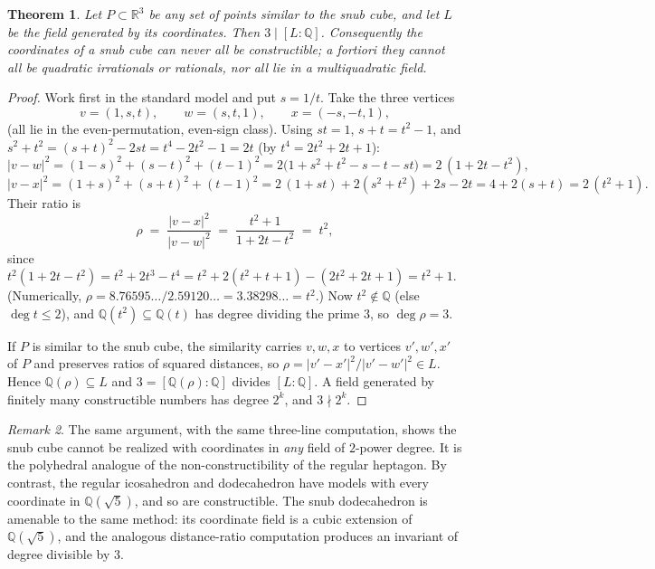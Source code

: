 \documentclass[11pt]{article}
\newtheorem{theorem}{Theorem}
\theoremstyle{definition}
\theoremstyle{remark}
\newtheorem{remark}[theorem]{Remark}
\newcommand{\Q}{\mathbb{Q}}
\newcommand{\R}{\mathbb{R}}
\begin{document}
\begin{theorem}\label{thm:snub}
Let $P \subset \R^3$ be any set of points similar to the snub cube, and let $L$ be the field
generated by its coordinates. Then $3 \mid [L : \Q]$. Consequently the coordinates of a snub
cube can never all be constructible; a fortiori they cannot all be quadratic irrationals or
rationals, nor all lie in a multiquadratic field.
\end{theorem}

\begin{proof}
Work first in the standard model and put $s = 1/t$. Take the three vertices
\[
v = (1, s, t), \qquad w = (s, t, 1), \qquad x = (-s, -t, 1),
\]
(all lie in the even-permutation, even-sign class). Using $st = 1$, $s + t = t^2 - 1$, and
$s^2 + t^2 = (s+t)^2 - 2st = t^4 - 2t^2 - 1 = 2t$ (by $t^4 = 2t^2 + 2t + 1$):
\[
|v - w|^2 = (1-s)^2 + (s-t)^2 + (t-1)^2
= 2\bigl(1 + s^2 + t^2 - s - t - st\bigr)
= 2\,(1 + 2t - t^2),
\]
\[
|v - x|^2 = (1+s)^2 + (s+t)^2 + (t-1)^2
= 2\,(1 + st) + 2(s^2 + t^2) + 2s - 2t
= 4 + 2(s + t) = 2\,(t^2 + 1).
\]
Their ratio is
\[
\rho \;=\; \frac{|v-x|^2}{|v-w|^2} \;=\; \frac{t^2 + 1}{1 + 2t - t^2} \;=\; t^2,
\]
since $t^2 (1 + 2t - t^2) = t^2 + 2t^3 - t^4 = t^2 + 2(t^2+t+1) - (2t^2+2t+1) = t^2 + 1$.
(Numerically, $\rho = 8.76595\ldots/2.59120\ldots = 3.38298\ldots = t^2$.) Now $t^2 \notin \Q$
(else $\deg t \le 2$), and $\Q(t^2) \subseteq \Q(t)$ has degree dividing the prime $3$, so
$\deg \rho = 3$.

If $P$ is similar to the snub cube, the similarity carries $v, w, x$ to vertices
$v', w', x'$ of $P$ and preserves ratios of squared distances, so
$\rho = |v'-x'|^2 / |v'-w'|^2 \in L$. Hence $\Q(\rho) \subseteq L$ and
$3 = [\Q(\rho):\Q]$ divides $[L:\Q]$. A field generated by finitely many constructible
numbers has degree $2^k$, and $3 \nmid 2^k$.
\end{proof}

\begin{remark}
The same argument, with the same three-line computation, shows the snub cube cannot be
realized with coordinates in \emph{any} field of $2$-power degree. It is the polyhedral
analogue of the non-constructibility of the regular heptagon. By contrast, the regular
icosahedron and dodecahedron have models with every coordinate in $\Q(\sqrt5)$, and so are
constructible. The snub dodecahedron is amenable to the same method: its coordinate field
is a cubic extension of $\Q(\sqrt5)$, and the analogous distance-ratio computation produces an
invariant of degree divisible by $3$.
\end{remark}
\end{document}
